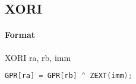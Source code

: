 \subsection{XORI}


\paragraph{Format} XORI ra, rb, imm

\begin{lstlisting}[language=C]
    GPR[ra] = GPR[rb] ^ ZEXT(imm);
\end{lstlisting}